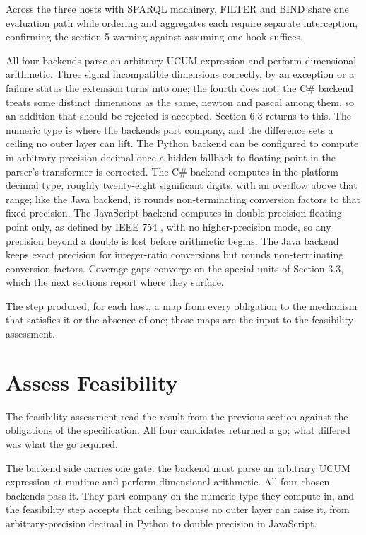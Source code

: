 Across the three hosts with SPARQL machinery, FILTER and BIND share one evaluation path while ordering and aggregates each require separate interception, confirming the section 5 warning against assuming one hook suffices.

All four backends parse an arbitrary UCUM expression and perform dimensional arithmetic. Three signal incompatible dimensions correctly, by an exception or a failure status the extension turns into one; the fourth does not: the  C\# backend treats some distinct dimensions as the same, newton and pascal among them, so an addition that should be rejected is accepted. Section 6.3 returns to this. The numeric type is where the backends part company, and the difference sets a ceiling no outer layer can lift. The Python backend can be configured to compute in arbitrary-precision decimal once a hidden fallback to floating point in the parser's transformer is corrected. The  C\# backend computes in the platform decimal type, roughly twenty-eight significant digits, with an overflow above that range; like the Java backend, it rounds non-terminating conversion factors to that fixed precision. The JavaScript backend computes in double-precision floating point only, as defined by IEEE 754 \cite{ieee2019_754}, with no higher-precision mode, so any precision beyond a double is lost before arithmetic begins. The Java backend keeps exact precision for integer-ratio conversions but rounds non-terminating conversion factors. Coverage gaps converge on the special units of Section 3.3, which the next sections report where they surface.

The step produced, for each host, a map from every obligation to the mechanism that satisfies it or the absence of one; those maps are the input to the feasibility assessment.


\section{Assess Feasibility}

The feasibility assessment read the result from the previous section against the obligations of the specification. All four candidates returned a go; what differed was what the go required.

The backend side carries one gate: the backend must parse an arbitrary UCUM expression at runtime and perform dimensional arithmetic. All four chosen backends pass it. They part company on the numeric type they compute in, and the feasibility step accepts that ceiling because no outer layer can raise it, from arbitrary-precision decimal in Python to double precision in JavaScript.

